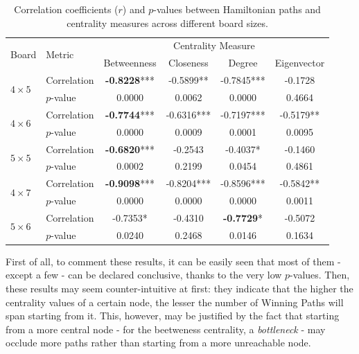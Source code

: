 \documentclass[conference]{IEEEtran}
\begin{document}
\begin{table}[ht]
	\centering
	\setlength{\tabcolsep}{3.9pt}
	\renewcommand{\arraystretch}{1.2}
	\begin{tabular}{|llcccc|}
		\hline
		\multirow{2}{*}{Board} & \multirow{2}{*}{Metric} & \multicolumn{4}{c}{Centrality Measure} \\
		\cmidrule(lr){3-6}
		& & Betweenness & Closeness & Degree & Eigenvector \\
		\hline
		\multirow{2}{*}{$4 \times 5$} 
		& Correlation & \textbf{-0.8228}*** & -0.5899** & -0.7845*** & -0.1728 \\
		& $p$-value   & 0.0000 & 0.0062 & 0.0000 & 0.4664 \\
		\hline
		\multirow{2}{*}{$4 \times 6$} 
		& Correlation & \textbf{-0.7744}*** & -0.6316*** & -0.7197*** & -0.5179** \\
		& $p$-value   & 0.0000 & 0.0009 & 0.0001 & 0.0095 \\
		\hline
		\multirow{2}{*}{$5 \times 5$} 
		& Correlation & \textbf{-0.6820}*** & -0.2543 & -0.4037* & -0.1460 \\
		& $p$-value   & 0.0002 & 0.2199 & 0.0454 & 0.4861 \\
		\hline
		\multirow{2}{*}{$4 \times 7$} 
		& Correlation & \textbf{-0.9098}*** & -0.8204*** & -0.8596*** & -0.5842** \\
		& $p$-value   & 0.0000 & 0.0000 & 0.0000 & 0.0011 \\
		\hline
		\multirow{2}{*}{$5 \times 6$} 
		& Correlation & -0.7353* & -0.4310 & \textbf{-0.7729}* & -0.5072 \\
		& $p$-value   & 0.0240 & 0.2468 & 0.0146 & 0.1634 \\
		\hline
	\end{tabular}
	\caption{Correlation coefficients ($r$) and $p$-values between Hamiltonian paths and centrality measures across different board sizes.}
	\label{tab:correlations}
\end{table}

First of all, to comment these results, it can be easily seen that most of them - except a few - can be declared conclusive, thanks to the very low $p$-values.
Then, these results may seem counter-intuitive at first: they indicate that the higher the centrality values of a certain node, the lesser the number of Winning Paths will span starting from it. This, however, may be justified by the fact that starting from a more central node - for the beetweness centrality, a \textit{bottleneck} - may occlude more paths rather than starting from a more unreachable node.
\end{document}
